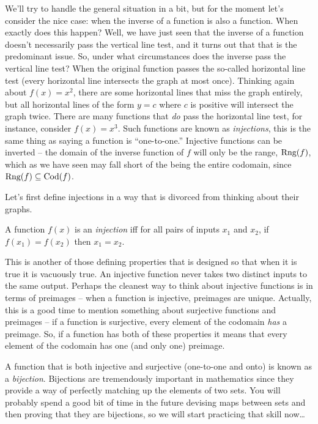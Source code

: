 We'll try to handle the general situation in a bit, but for the moment let's
consider the nice case: when the inverse of a function is also a function. 
When exactly does this happen?  Well, we have just seen that the inverse
of a function doesn't necessarily pass the vertical line test, and it turns
out that that is the predominant issue.  So, under what circumstances does
the inverse pass the vertical line test?  When the original function 
passes the so-called horizontal line test (every horizontal line
intersects the graph at most once).  Thinking again about $f(x)=x^2$, there
are some horizontal lines that miss the graph entirely, but all horizontal
lines of the form $y=c$ where $c$ is positive will intersect the graph twice.
There are many functions that \emph{do} pass the horizontal line test, for 
instance, consider $f(x) = x^3$.  Such functions are known as 
\emph{injections}, this is the same thing as 
saying a function is ``one-to-one.''   Injective functions can be inverted --
the domain of the inverse function of $f$ will only be the range, $\mbox{Rng}(f)$,
which as we have seen may fall short of the being the entire codomain, since 
$\mbox{Rng}(f) \subseteq \mbox{Cod}(f)$.

Let's first define injections in a way that is divorced from thinking
about their graphs.

\begin{defi}
A function $f(x)$ is an \emph{injection} iff for all pairs of 
inputs $x_1$ and $x_2$, if $f(x_1) = f(x_2)$ then $x_1=x_2$.
\end{defi}

This is another of those defining properties that is designed so
that when it is true it is vacuously true.  An injective function
never takes two distinct inputs to the same output.  Perhaps the 
cleanest way to think about injective functions is in terms of 
preimages -- when a function is injective, preimages are unique.
Actually, this is a good time to mention something about surjective
functions and preimages -- if a function is surjective, every element
of the codomain \emph{has} a preimage.  So, if a function has both 
of these properties it means that every element of the codomain
has one (and only one) preimage.   

A function that is both injective and surjective (one-to-one and onto)
is known as a \emph{bijection}.  Bijections are tremendously
important in mathematics since they provide a way of perfectly matching
up the elements of two sets.  You will probably spend a good bit of time 
in the future devising maps between sets and then proving that they are
bijections, so we will start practicing that skill now\ldots  

